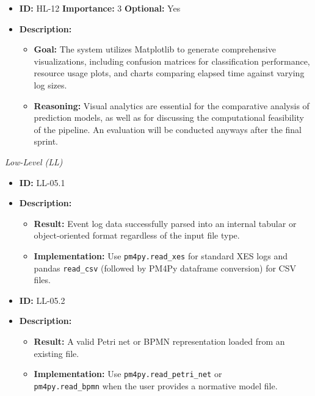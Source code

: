 \documentclass[12pt,a4paper]{article}
\begin{document}
\begin{itemize}
\item \textbf{ID:} HL-12
 \textbf{Importance:} 3
 \textbf{Optional:} Yes
    \item \textbf{Description:}
    \begin{itemize}
        \item \textbf{Goal:} The system utilizes Matplotlib to generate comprehensive visualizations, including confusion matrices for classification performance, resource usage plots, and charts comparing elapsed time against varying log sizes.
        \item \textbf{Reasoning:} Visual analytics are essential for the comparative analysis of prediction models, as well as for discussing the computational feasibility of the pipeline. An evaluation will be conducted anyways after the final sprint.
    \end{itemize}
\end{itemize}
\vspace{1.5em}

\noindent \textit{Low-Level (LL)}

\begin{itemize}
    \item \textbf{ID:} LL-05.1
    \item \textbf{Description:}
    \begin{itemize}
        \item \textbf{Result:} Event log data successfully parsed into an internal tabular or object-oriented format regardless of the input file type.
        \item \textbf{Implementation:} Use \texttt{pm4py.read\_xes} for standard XES logs and pandas \texttt{read\_csv} (followed by PM4Py dataframe conversion) for CSV files.
    \end{itemize}
\end{itemize}
\vspace{1.5em}

\begin{itemize}
    \item \textbf{ID:} LL-05.2
    \item \textbf{Description:}
    \begin{itemize}
        \item \textbf{Result:} A valid Petri net or BPMN representation loaded from an existing file.
        \item \textbf{Implementation:} Use \texttt{pm4py.read\_petri\_net} or \\ \texttt{pm4py.read\_bpmn} when the user provides a normative model file.
    \end{itemize}
\end{itemize}
\vspace{1.5em}
\end{document}

